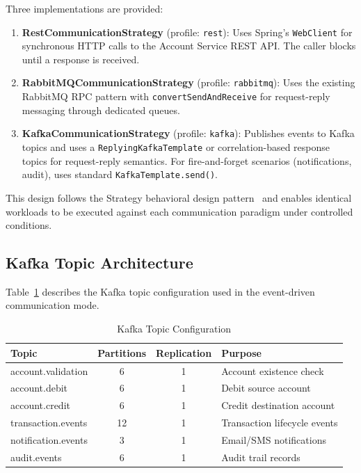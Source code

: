 \documentclass[journal]{IEEEtran}
\begin{document}
Three implementations are provided:

\begin{enumerate}
    \item \textbf{RestCommunicationStrategy} (profile: \texttt{rest}): Uses Spring's \texttt{WebClient} for synchronous HTTP calls to the Account Service REST API. The caller blocks until a response is received.
    \item \textbf{RabbitMQCommunicationStrategy} (profile: \texttt{rabbitmq}): Uses the existing RabbitMQ RPC pattern with \texttt{convertSendAndReceive} for request-reply messaging through dedicated queues.
    \item \textbf{KafkaCommunicationStrategy} (profile: \texttt{kafka}): Publishes events to Kafka topics and uses a \texttt{ReplyingKafkaTemplate} or correlation-based response topics for request-reply semantics. For fire-and-forget scenarios (notifications, audit), uses standard \texttt{KafkaTemplate.send()}.
\end{enumerate}

This design follows the Strategy behavioral design pattern~\cite{gamma1994design} and enables identical workloads to be executed against each communication paradigm under controlled conditions.

\subsection{Kafka Topic Architecture}
\label{subsec:kafka_topics}

Table~\ref{tab:kafka_topics} describes the Kafka topic configuration used in the event-driven communication mode.

\begin{table}[!t]
\caption{Kafka Topic Configuration}
\label{tab:kafka_topics}
\centering
\scriptsize
\begin{tabularx}{\columnwidth}{lccX}
\toprule
\textbf{Topic} & \textbf{Partitions} & \textbf{Replication} & \textbf{Purpose} \\
\midrule
account.validation & 6 & 1 & Account existence check \\
account.debit & 6 & 1 & Debit source account \\
account.credit & 6 & 1 & Credit destination account \\
transaction.events & 12 & 1 & Transaction lifecycle events \\
notification.events & 3 & 1 & Email/SMS notifications \\
audit.events & 6 & 1 & Audit trail records \\
\bottomrule
\end{tabularx}
\end{table}
\end{document}
